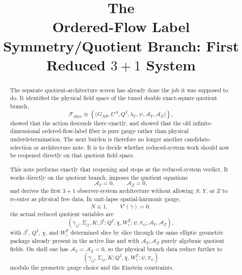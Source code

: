 \documentclass[11pt]{article}
\title{\textbf{The \TheoryName{}}\\[0.4em]
\large Ordered-Flow Label Symmetry/Quotient Branch: First Reduced \texorpdfstring{$3+1$}{3+1} System}
\author{}
\date{}
\newcommand{\AY}{\mathcal A_Y}
\newcommand{\AZ}{\mathcal A_Z}
\newcommand{\FieldSpace}{\mathscr F}
\newcommand{\PhysFieldSpace}{\FieldSpace_{\mathrm{phys}}}
\begin{document}
\maketitle

\begin{abstract}
The separate quotient-architecture screen has already done the job it was supposed to do. It identified the physical field space of the tuned double exact-square quotient branch,
\[
\PhysFieldSpace
\cong
\left\{
\bigl(G_{AB},U^A,Q^I,\lambda_U,\psi,\AY,\AZ\bigr)
\right\},
\]
showed that the action descends there exactly, and showed that the old infinite-dimensional ordered-flow-label fiber is pure gauge rather than physical underdetermination. The next burden is therefore no longer another candidate-selection or architecture note. It is to decide whether reduced-system work should now be reopened directly on that quotient field space.

This note performs exactly that reopening and stops at the reduced-system verdict. It works directly on the quotient branch, imposes the quotient equations
\[
\AY=0,
\qquad
\AZ=0,
\]
and derives the first \(3+1\) observer-system architecture without allowing \(S\), \(Y\), or \(Z\) to re-enter as physical free data. In unit-lapse spatial-harmonic gauge,
\[
N\equiv 1,
\qquad
V^i(\gamma)=0,
\]
the actual reduced quotient variables are
\[
(\gamma_{ij},\Sigma_{ij},K;\beta^i;Q^I,\chi,W_i^T;\psi,\pi_\psi;\AY,\AZ),
\]
with \(\beta^i\), \(Q^I\), \(\chi\), and \(W_i^T\) determined slice by slice through the same elliptic geometric package already present in the active line and with \(\AY,\AZ\) purely algebraic quotient fields. On shell one has \(\AY=\AZ=0\), so the physical branch data reduce further to
\[
(\gamma_{ij},\Sigma_{ij},K;Q^I,\chi,W_i^T;\psi,\pi_\psi)
\]
modulo the geometric gauge choice and the Einstein constraints.


\end{abstract}
\end{document}
